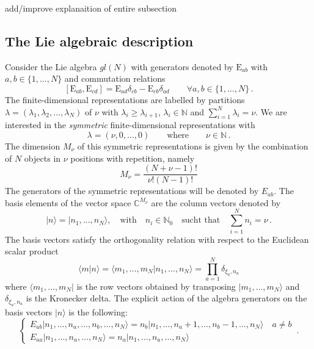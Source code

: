 \documentclass[11pt]{article}
\numberwithin{equation}{section}
\numberwithin{equation}{subsection}
\newcommand{\EE}{\mathrm{E}}
\newcommand{\twoj}{\nu}
\begin{document}
{\color{red}add/improve explanaition of entire subsection}
\subsection{The Lie algebraic description}


Consider the Lie algebra $gl(N)$ with generators denoted by $\EE_{ab}$ with $a,b\in \{1,\ldots,N\}$ and commutation relations
\begin{equation}\label{eq:comgl}
\left[\EE_{ab},\EE_{cd}\right]=\EE_{ad}\delta_{cb}-\EE_{cb}\delta_{ad}\qquad \forall a,b\in \{1,\ldots,N\}\,.
\end{equation}
The finite-dimensional representations are labelled by partitions $\lambda=(\lambda_1,\lambda_2,\ldots,\lambda_N)$ of $\nu$ with  $\lambda_i\geq \lambda_{i+1}$,  $\lambda_i\in \mathbb{N}$ and $\sum_{i=1}^N \lambda_i = \nu$.  
We are interested in the {\em symmetric} finite-dimensional representations with 
\begin{equation}\label{eq:dynkin}
    \lambda=(\twoj,0,\ldots,0) \qquad\text{where}\qquad \twoj\in\mathbb{N}\,.
\end{equation} 
The dimension $M_\twoj$ of this symmetric representations is given by the combination of $N$ objects in $\twoj$ positions with repetition, namely
\begin{equation}
	M_\twoj= \frac{(N+\twoj-1)!}{\twoj  !(N-1)!}
\end{equation} 
The generators of the symmetric representations will be denoted by $E_{ab}$.
The basis elements of the vector space $\mathbb{C}^{M_\twoj}$ are the column vectors denoted by
\begin{equation}
  |n\rangle=  |n_{1},\ldots,n_{N}\rangle,\quad \text{with}\quad n_{i}\in\mathbb{N}_{0}\quad \text{sucht that}\quad \sum_{i=1}^{N}n_{i}=\nu\,.
\end{equation}
The basis vectors satisfy the orthogonality relation with respect to the Euclidean scalar product 
\begin{equation}\label{ortho}
   \langle m|n \rangle =\langle m_{1},\ldots,m_{N}|n_{1},\ldots,n_{N}\rangle=\prod_{a=1}^{N}\delta_{\xi_{a},n_{a}}
\end{equation}
where  $ \langle m_{1},\ldots,m_{N}|$ is the row vectors obtained by transposing $|m_{1},\ldots,m_{N}\rangle$ and $\delta_{\xi_{a},n_{a}}$ is the Kronecker delta. 
The explicit action of the algebra generators on the basis  vectors $|n\rangle$ is the following:
\begin{equation}\label{actionE}
	\begin{cases}
		E_{ab}|n_{1},\ldots,n_{a},\ldots,n_{b},\ldots,n_{N}\rangle =n_{b}|n_{1},\ldots,n_{a}+1,\ldots,n_{b}-1,\ldots,n_{N}\rangle\quad a\neq b\\[0.1cm]
		E_{aa}|n_{1},\ldots,n_{a},\ldots,n_{N}\rangle = n_{a} |n_{1},\ldots,n_{a},\ldots,n_{N}\rangle
	\end{cases}\,.
\end{equation}  
\end{document}
